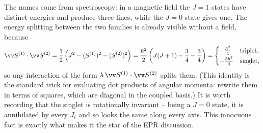 \begin{center}
\end{center}

The names come from spectroscopy: in a magnetic field the $J=1$ states have distinct energies and produce three lines, while the $J=0$ state gives one. The energy splitting between the two families is already visible without a field, because
$$
\vv S^{(1)}\cdot \vv S^{(2)} = \frac{1}{2}\left( J^2 - (S^{(1)})^2 - (S^{(2)})^2 \right) = \frac{\hbar^2}{2}\left( J(J+1) - \frac34 - \frac34 \right)
= \begin{cases} +\frac{\hbar^2}{4} & \text{triplet},\\[2pt] -\frac{3\hbar^2}{4} & \text{singlet},\end{cases}
$$
so any interaction of the form $\lambda\, \vv S^{(1)}\cdot\vv S^{(2)}$ splits them. (This identity is the standard trick for evaluating dot products of angular momenta: rewrite them in terms of squares, which are diagonal in the coupled basis.) It is worth recording that the singlet is rotationally invariant -- being a $J=0$ state, it is annihilated by every $J_i$ and so looks the same along every axis. This innocuous fact is exactly what makes it the star of the EPR discussion.

